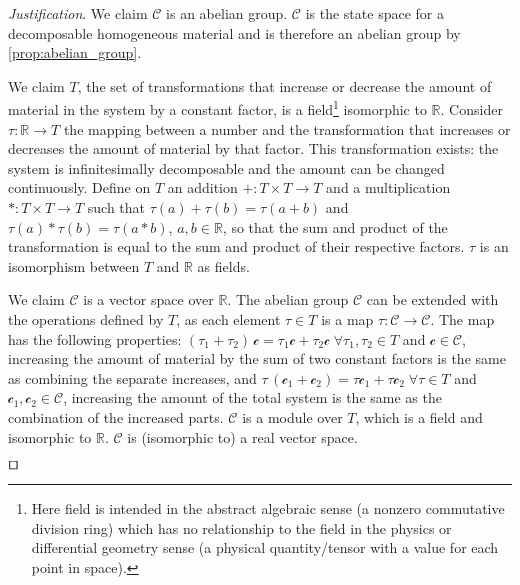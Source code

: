 \documentclass[smallextended]{svjour3}
\numberwithin{equation}{section}
\newenvironment{justification}{\emph{Justification}.}{\hfill\(\qed\)}
\theoremstyle{definition}
\newenvironment{justification}{\emph{Justification}.}{\qed}
\begin{document}
\begin{justification}
We claim $\mathcal{C}$ is an abelian group. $\mathcal{C}$ is the state space for a decomposable homogeneous material and is therefore an abelian group  by \ref{prop:abelian_group}.

We claim $T$, the set of transformations that increase or decrease the amount of material in the system by a constant factor, is a field\footnote{Here field is intended in the abstract algebraic sense (a nonzero commutative division ring) which has no relationship to the field in the physics or differential geometry sense (a physical quantity/tensor with a value for each point in space).} isomorphic to $\mathbb{R}$. Consider $\tau: \mathbb{R} \rightarrow T$ the mapping between a number and the transformation that increases or decreases the amount of material by that factor. This transformation exists: the system is infinitesimally decomposable and the amount can be changed continuously. Define on $T$ an addition $+: T \times T \rightarrow T$ and a multiplication $*: T \times T \rightarrow T$ such that $\tau(a) + \tau(b) = \tau(a+b)$ and $\tau(a) * \tau(b) = \tau(a*b)$, $a,b \in \mathbb{R}$, so that the sum and product of the transformation is equal to the sum and product of their respective factors. $\tau$ is an isomorphism between $T$ and $\mathbb{R}$ as fields.

We claim $\mathcal{C}$ is a vector space over $\mathbb{R}$. The abelian group $\mathcal{C}$ can be extended with the operations defined by $T$, as each element $\tau \in T$ is a map $\tau : \mathcal{C} \rightarrow \mathcal{C}$. The map has the following properties: $(\tau_1 + \tau_2) \, \mathcal{c} = \tau_1 \mathcal{c} + \tau_2 \mathcal{c} \; \forall \tau_1, \tau_2 \in T$ and $\mathcal{c} \in \mathcal{C}$, increasing the amount of material by the sum of two constant factors is the same as combining the separate increases, and $\tau \, (\mathcal{c}_1 + \mathcal{c}_2) = \tau \mathcal{c}_1 + \tau \mathcal{c}_2\; \forall \tau \in T$ and $\mathcal{c}_1, \mathcal{c}_2 \in \mathcal{C}$, increasing the amount of the total system is the same as the combination of the increased parts. $\mathcal{C}$ is a module over $T$, which is a field and isomorphic to $\mathbb{R}$. $\mathcal{C}$ is (isomorphic to) a real vector space.


\end{justification}
\end{document}
